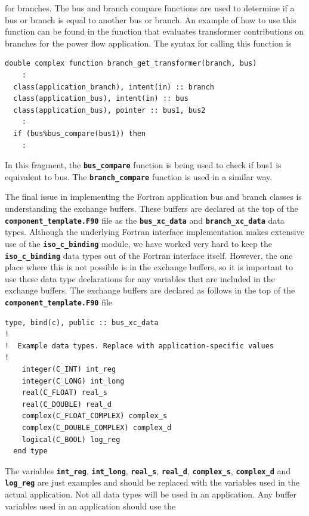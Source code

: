 \documentclass[12pt]{report} %
\begin{document}
for branches. The bus and branch compare functions are used to determine if a bus or branch is equal to another bus or branch. An example of how to use this function can be found in the function that evaluates transformer contributions on branches for the power flow application. The syntax for calling this function is

{
\color{red}
\begin{Verbatim}[fontseries=b]
double complex function branch_get_transformer(branch, bus)
    :
  class(application_branch), intent(in) :: branch
  class(application_bus), intent(in) :: bus
  class(application_bus), pointer :: bus1, bus2
    :
  if (bus%bus_compare(bus1)) then
    :
\end{Verbatim}
}

In this fragment, the \texttt{\textbf{bus\_compare}} function is being used to check if bus1 is equivalent to bus. The \texttt{\textbf{branch\_compare}} function is used in a similar way.

The final issue in implementing the Fortran application bus and branch classes is understanding the exchange buffers. These buffers are declared at the top of the \texttt{\textbf{component\_template.F90}} file as the \texttt{\textbf{bus\_xc\_data}} and \texttt{\textbf{branch\_xc\_data}} data types. Although the underlying Fortran interface implementation makes extensive use of the \texttt{\textbf{iso\_c\_binding}} module, we have worked very hard to keep the \texttt{\textbf{iso\_c\_binding}} data types out of the Fortran interface itself. However, the one place where this is not possible is in the exchange buffers, so it is important to use these data type declarations for any variables that are included in the exchange buffers. The exchange buffers are declared as follows in the top of the \texttt{\textbf{component\_template.F90}} file

{
\color{red}
\begin{Verbatim}[fontseries=b]
  type, bind(c), public :: bus_xc_data
!
!  Example data types. Replace with application-specific values
!
    integer(C_INT) int_reg
    integer(C_LONG) int_long
    real(C_FLOAT) real_s
    real(C_DOUBLE) real_d
    complex(C_FLOAT_COMPLEX) complex_s
    complex(C_DOUBLE_COMPLEX) complex_d
    logical(C_BOOL) log_reg
  end type
\end{Verbatim}
}

The variables \texttt{\textbf{int\_reg}}, \texttt{\textbf{int\_long}}, \texttt{\textbf{real\_s}}, \texttt{\textbf{real\_d}}, \texttt{\textbf{complex\_s}}, \texttt{\textbf{complex\_d}} and \texttt{\textbf{log\_reg}} are just examples and should be replaced with the variables used in the actual application. Not all data types will be used in an application. Any buffer variables used in an application should use the
\end{document}
